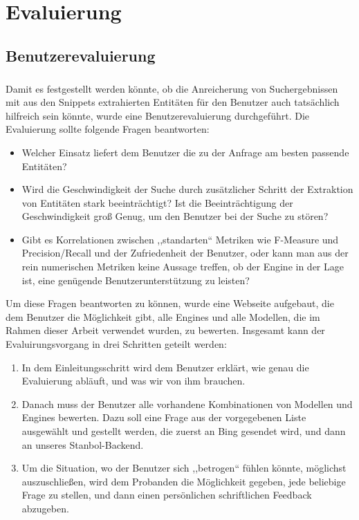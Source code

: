 \chapter{Evaluierung}

\section{Benutzerevaluierung}
\paragraph{}
Damit es festgestellt werden könnte, ob die Anreicherung von Suchergebnissen mit aus den Snippets extrahierten Entitäten für den Benutzer auch tatsächlich hilfreich sein könnte, wurde eine Benutzerevaluierung durchgeführt. Die Evaluierung sollte folgende Fragen beantworten:

\begin{itemize}
\item Welcher Einsatz liefert dem Benutzer die zu der Anfrage am besten passende Entitäten? 
\item Wird die Geschwindigkeit der Suche durch zusätzlicher Schritt der Extraktion von Entitäten stark beeinträchtigt? Ist die Beeinträchtigung der Geschwindigkeit groß Genug, um den Benutzer bei der Suche zu stören?
\item Gibt es Korrelationen zwischen ,,standarten`` Metriken wie F-Measure und Precision/Recall und der Zufriedenheit der Benutzer, oder kann man aus der rein numerischen Metriken keine Aussage treffen, ob der Engine in der Lage ist, eine genügende Benutzerunterstützung zu leisten?
\end{itemize}

Um diese Fragen beantworten zu können, wurde eine Webseite aufgebaut, die dem Benutzer die Möglichkeit gibt, alle Engines und alle Modellen, die im Rahmen dieser Arbeit verwendet wurden, zu bewerten. Insgesamt kann der Evaluirungsvorgang in drei Schritten geteilt werden:

\begin{enumerate}
\item In dem Einleitungsschritt wird dem Benutzer erklärt, wie genau die Evaluierung abläuft, und was wir von ihm brauchen.
\item Danach muss der Benutzer alle vorhandene Kombinationen von Modellen und Engines bewerten. Dazu soll eine Frage aus der vorgegebenen Liste ausgewählt und gestellt werden, die zuerst an Bing gesendet wird, und dann an unseres Stanbol-Backend.
\item Um die Situation, wo der Benutzer sich ,,betrogen`` fühlen könnte, möglichst auszuschließen, wird dem Probanden die Möglichkeit gegeben, jede beliebige Frage zu stellen, und dann einen persönlichen schriftlichen Feedback abzugeben.
\end{enumerate}

